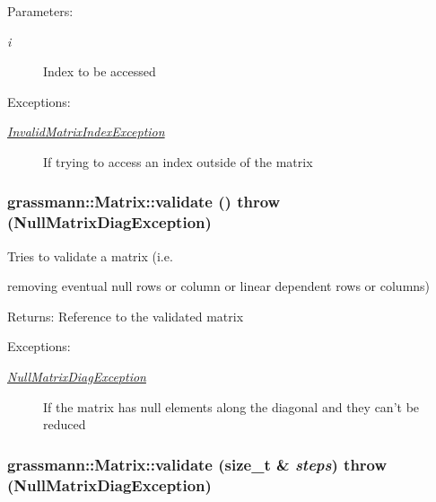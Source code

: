 \begin{Desc}
\item[Parameters:]
\begin{description}
\item[{\em i}]Index to be accessed \end{description}
\end{Desc}
\begin{Desc}
\item[Exceptions:]
\begin{description}
\item[{\em \hyperlink{classgrassmann_1_1InvalidMatrixIndexException}{InvalidMatrixIndexException}}]If trying to access an index outside of the matrix \end{description}
\end{Desc}
\hypertarget{classgrassmann_1_1Matrix_ebdbbb13e0261f2c1af0f049e28adf89}{
\subsubsection[validate]{ grassmann::Matrix::validate ()  throw ({\bf NullMatrixDiagException})}}
\label{classgrassmann_1_1Matrix_ebdbbb13e0261f2c1af0f049e28adf89}


Tries to validate a matrix (i.e. 

removing eventual null rows or column or linear dependent rows or columns) \begin{Desc}
\item[Returns:]Reference to the validated matrix \end{Desc}
\begin{Desc}
\item[Exceptions:]
\begin{description}
\item[{\em \hyperlink{classgrassmann_1_1NullMatrixDiagException}{NullMatrixDiagException}}]If the matrix has null elements along the diagonal and they can't be reduced \end{description}
\end{Desc}
\hypertarget{classgrassmann_1_1Matrix_400d47ca9b0e1d7bd4ad731415a83bca}{
\subsubsection[validate]{ grassmann::Matrix::validate (size\_\-t \& {\em steps})  throw ({\bf NullMatrixDiagException})}}
\label{classgrassmann_1_1Matrix_400d47ca9b0e1d7bd4ad731415a83bca}


